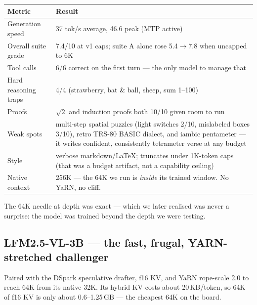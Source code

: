 \documentclass[11pt,a4paper]{article}
\begin{document}
\begin{center}
\small
\begin{tabularx}{\textwidth}{L{4.6cm} X}
\toprule
\textbf{Metric} & \textbf{Result} \\
\midrule
Generation speed & 37 tok/s average, 46.6 peak (MTP active) \\
Overall suite grade & 7.4/10 at v1 caps; suite A alone rose 5.4$\to$7.8 when uncapped to 6K \\
Tool calls & 6/6 correct on the first turn --- the only model to manage that \\
Hard reasoning traps & 4/4 (strawberry, bat \& ball, sheep, sum 1--100) \\
Proofs & $\sqrt{2}$ and induction proofs both 10/10 given room to run \\
Weak spots & multi-step spatial puzzles (light switches 2/10, mislabeled boxes 3/10), retro TRS-80 BASIC dialect, and iambic pentameter --- it writes confident, consistently tetrameter verse at any budget \\
Style & verbose markdown/LaTeX; truncates under 1K-token caps (that was a budget artifact, not a capability ceiling) \\
Native context & 256K --- the 64K we run is \emph{inside} its trained window. No YaRN, no cliff. \\
\bottomrule
\end{tabularx}
\end{center}

The 64K needle at depth was exact --- which we later realised was never a
surprise: the model was trained beyond the depth we were testing.

\subsection{LFM2.5-VL-3B --- the fast, frugal, YARN-stretched challenger}
\label{sec:lfm}

Paired with the DSpark speculative drafter, f16 KV, and YaRN rope-scale 2.0
to reach 64K from its native 32K. Its hybrid KV costs about 20\,KB/token,
so 64K of f16 KV is only about 0.6--1.25\,GB --- the cheapest 64K on the
board.
\end{document}
